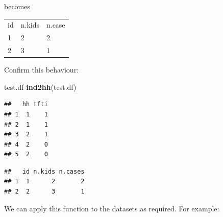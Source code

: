 \documentclass[12pt,a4paper]{book}
\newenvironment{Shaded}{\begin{snugshade}}{\end{snugshade}}
\newcommand{\KeywordTok}[1]{\textcolor[rgb]{0.13,0.29,0.53}{\textbf{#1}}}
\newcommand{\NormalTok}[1]{#1}
\theoremstyle{definition}
\theoremstyle{definition}
\theoremstyle{definition}
\theoremstyle{remark}
\begin{document}
becomes

\begin{longtable}[]{@{}lll@{}}
\toprule
\begin{minipage}[t]{0.08\columnwidth}\raggedright
id\strut
\end{minipage} & \begin{minipage}[t]{0.14\columnwidth}\raggedright
n.kids\strut
\end{minipage} & \begin{minipage}[t]{0.14\columnwidth}\raggedright
n.case\strut
\end{minipage}\tabularnewline
\begin{minipage}[t]{0.08\columnwidth}\raggedright
1\strut
\end{minipage} & \begin{minipage}[t]{0.14\columnwidth}\raggedright
2\strut
\end{minipage} & \begin{minipage}[t]{0.14\columnwidth}\raggedright
2\strut
\end{minipage}\tabularnewline
\begin{minipage}[t]{0.08\columnwidth}\raggedright
2\strut
\end{minipage} & \begin{minipage}[t]{0.14\columnwidth}\raggedright
3\strut
\end{minipage} & \begin{minipage}[t]{0.14\columnwidth}\raggedright
1\strut
\end{minipage}\tabularnewline
\bottomrule
\end{longtable}

Confirm this behaviour:

\begin{Shaded}
\begin{Highlighting}[]
\NormalTok{test.df}
\KeywordTok{ind2hh}\NormalTok{(test.df)}
\end{Highlighting}
\end{Shaded}

\begin{verbatim}
##   hh tfti
## 1  1    1
## 2  1    1
## 3  2    1
## 4  2    0
## 5  2    0
\end{verbatim}

\begin{verbatim}
##   id n.kids n.cases
## 1  1      2       2
## 2  2      3       1
\end{verbatim}

We can apply this function to the datasets as required. For example:
\end{document}
